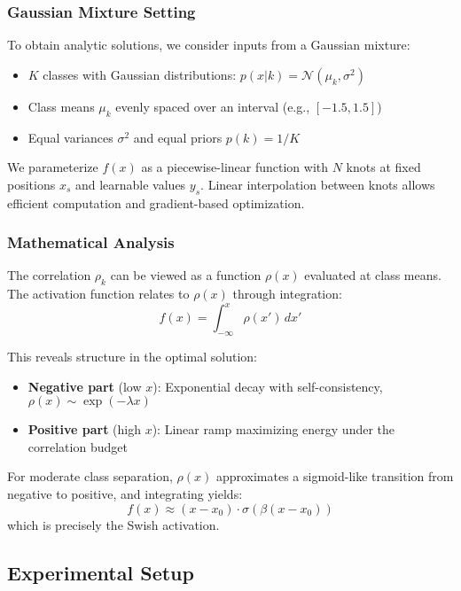 \documentclass{article}
\begin{document}
\subsubsection{Gaussian Mixture Setting}

To obtain analytic solutions, we consider inputs from a Gaussian mixture:
\begin{itemize}
\item $K$ classes with Gaussian distributions: $p(x|k) = \mathcal{N}(\mu_k, \sigma^2)$
\item Class means $\mu_k$ evenly spaced over an interval (e.g., $[-1.5, 1.5]$)
\item Equal variances $\sigma^2$ and equal priors $p(k) = 1/K$
\end{itemize}

We parameterize $f(x)$ as a piecewise-linear function with $N$ knots at fixed positions $x_s$ and learnable values $y_s$. Linear interpolation between knots allows efficient computation and gradient-based optimization.

\subsubsection{Mathematical Analysis}

The correlation $\rho_k$ can be viewed as a function $\rho(x)$ evaluated at class means. The activation function relates to $\rho(x)$ through integration:
\begin{equation}
f(x) = \int_{-\infty}^x \rho(x') \, dx'
\end{equation}

This reveals structure in the optimal solution:
\begin{itemize}
\item \textbf{Negative part} (low $x$): Exponential decay with self-consistency, $\rho(x) \sim \exp(-\lambda x)$
\item \textbf{Positive part} (high $x$): Linear ramp maximizing energy under the correlation budget
\end{itemize}

For moderate class separation, $\rho(x)$ approximates a sigmoid-like transition from negative to positive, and integrating yields:
\begin{equation}
f(x) \approx (x - x_0) \cdot \sigma(\beta(x - x_0))
\end{equation}
which is precisely the Swish activation.

\subsection{Experimental Setup}
\end{document}
